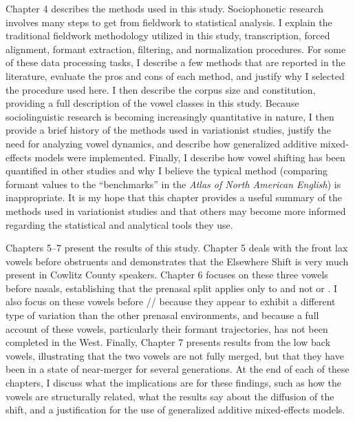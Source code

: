 Chapter 4 describes the methods used in this study. Sociophonetic research involves many steps to get from fieldwork to statistical analysis. I explain the traditional fieldwork methodology utilized in this study, transcription, forced alignment, formant extraction, filtering, and normalization procedures. For some of these data processing tasks, I describe a few methods that are reported in the literature, evaluate the pros and cons of each method, and justify why I selected the procedure used here. I then describe the corpus size and constitution, providing a full description of the vowel classes in this study. Because sociolinguistic research is becoming increasingly quantitative in nature, I then provide a brief history of the methods used in variationist studies, justify the need for analyzing vowel dynamics, and describe how generalized additive mixed-effects models were implemented. Finally, I describe how vowel shifting has been quantified in other studies and why I believe the typical method (comparing formant values to the ``benchmarks'' in the \textit{Atlas of North American English}) is inappropriate. It is my hope that this chapter provides a useful summary of the methods used in variationist studies and that others may become more informed regarding the statistical and analytical tools they use.

Chapters 5--7 present the results of this study. Chapter 5 deals with the front lax vowels before obstruents and demonstrates that the Elsewhere Shift is very much present in Cowlitz County speakers. Chapter 6 focuses on these three vowels before nasals, establishing that the prenasal split applies only to \trap and not \dress or \kit. I also focus on these vowels before // because they appear to exhibit a different type of variation than the other prenasal environments, and because a full account of these vowels, particularly their formant trajectories, has not been completed in the West. Finally, Chapter 7 presents results from the low back vowels, illustrating that the two vowels are not fully merged, but that they have been in a state of near-merger for several generations. At the end of each of these chapters, I discuss what the implications are for these findings, such as how the vowels are structurally related, what the results say about the diffusion of the shift, and a justification for the use of generalized additive mixed-effects models.

